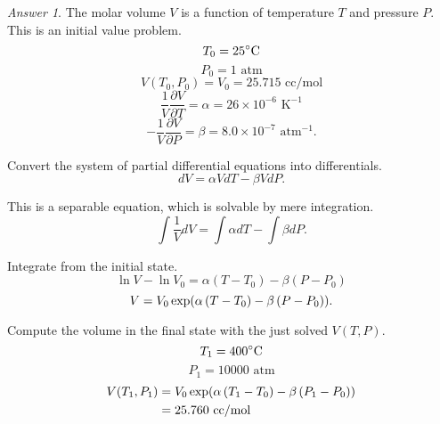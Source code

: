 \documentclass[a4paper, 12pt]{article}
\newcommand{\Left}{\mathopen{}\mathclose\bgroup\left}
\newcommand{\Right}{\aftergroup\egroup\right}
\theoremstyle{definition}
\theoremstyle{remark}
\newtheorem*{answer}{Answer}
\begin{document}
\begin{answer}
    The molar volume $V$ is a function of temperature $T$ and pressure $P$.
    This is an initial value problem.
    \[ T_0 = 25^\circ\text C \]
    \[ P_0 = 1\text{ atm} \]
    \[ V(T_0, P_0) = V_0 = 25.715\text{ cc/mol} \]
    \[ \frac1V \frac{\partial V}{\partial T} = \alpha = 26 \times 10^{-6}\text{ K}^{-1} \]
    \[ -\frac1V \frac{\partial V}{\partial P} = \beta = 8.0 \times 10^{-7}\text{ atm}^{-1}.\]

    Convert the system of partial differential equations into differentials.
    \[ dV = \alpha V dT - \beta V dP.\]

    This is a separable equation, which is solvable by mere integration.
    \[ \int \frac1V dV = \int \alpha dT - \int \beta dP.\]

    Integrate from the initial state.
    \[ \ln V - \ln V_0 = \alpha \left( T - T_0 \right) - \beta \left( P - P_0 \right) \]
    \[ V = V_0 \exp \Left( \alpha \left( T - T_0 \right) - \beta \left( P - P_0 \right) \Right).\]

    Compute the volume in the final state with the just solved $V(T, P)$.
    \[ T_1 = 400^\circ\text C \]
    \[ P_1 = 10000\text{ atm} \]
    \begin{align*}
        V(T_1, P_1)
        &= V_0 \exp \Left( \alpha \left( T_1 - T_0 \right) - \beta \left( P_1 - P_0 \right) \Right) \\
        &= 25.760 \text{ cc/mol}
    \end{align*}
\end{answer}
\end{document}
